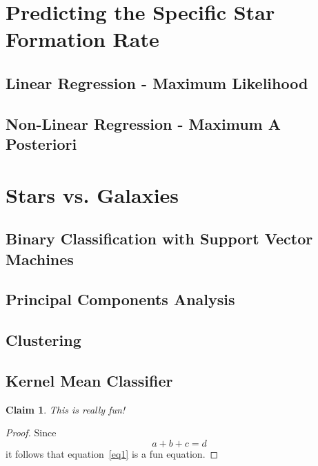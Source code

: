 \documentclass{article}
\theoremstyle{plain}
\newtheorem{claim}[equation]{Claim}
\theoremstyle{nonumberplain}
\newtheorem{proof}{Proof}
\begin{document}


\pagestyle{fancy}
\lhead{}
\chead{\leftmark}
\rhead{}
\cfoot{}

\section{Predicting the Specific Star Formation Rate}

\subsection{Linear Regression - Maximum Likelihood}

\subsection{Non-Linear Regression - Maximum A Posteriori}

\section{Stars vs. Galaxies}

\subsection{Binary Classification with Support Vector Machines}

\subsection{Principal Components Analysis}

\subsection{Clustering}

\subsection{Kernel Mean Classifier}

\begin{claim}
This is really fun!
\end{claim}

\begin{proof}
Since
\begin{equation} \label{eq1}
a + b + c = d
\end{equation}
it follows that equation~\eqref{eq1} is a fun equation.
\end{proof}
\end{document}
